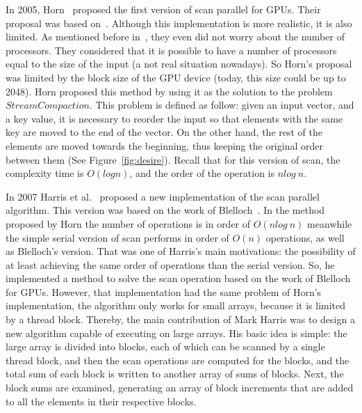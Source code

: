 \documentclass[Ingles]{ic-tese-v1}
\begin{document}
In 2005, Horn~\cite{GPUGems2} proposed the first version of scan parallel
for GPUs. Their proposal was based on~\cite{dataparallel}. Although this
implementation is more realistic, it is also  limited. As  mentioned before in~\cite{dataparallel},
they even did not worry about the number of processors.
They considered that it is possible to have a number of processors equal to the
size of the input (a not real situation nowadays).
So Horn's proposal was limited by the block size of the GPU device (today, this size could
be up to 2048). Horn proposed this method by using it
as the solution to the problem $Stream Compaction$. This problem is defined
as follow: given an input vector, and a key value,  it is necessary to
reorder the input so that elements with the same key are moved to the end of
the vector. On the other hand, the rest of the elements are moved towards the beginning,
thus keeping the original order between them (See Figure~\ref{fig:desire}). Recall
that for this version of scan, the complexity time is $O(log n)$, and the order of
the operation is $n log\ n$.

In 2007 Harris et al.~\cite{harris2007parallel} proposed a new
implementation of the scan parallel algorithm. This version was based on the work
of Blelloch~\cite{ScanAsPrimitive}. In the method proposed by Horn the number
of operations is in order of $O(n log\ n)$ meanwhile the simple serial version
of scan performs in order of $O(n)$ operations, as well as Blelloch's version.
That was one of Harris's main motivations: the possibility of at least achieving
the same order of operations than the serial version. So, he implemented a
method to solve the scan operation based on the work of Blelloch for GPUs.
However, that implementation had the same problem of Horn's implementation, the
algorithm only works for small arrays, because it is limited by a thread
block. Thereby, the main contribution of Mark Harris was to design a new
algorithm capable of executing on large arrays. His basic idea is simple:
the large array is divided into blocks, each of which
can be scanned by a single thread block, and then the scan operations are
computed for the blocks, and the total sum of each block is written to another
array of sums of blocks. Next, the block sums are examined, generating an array
of block increments that are added to all the elements in their respective
blocks.
\end{document}
